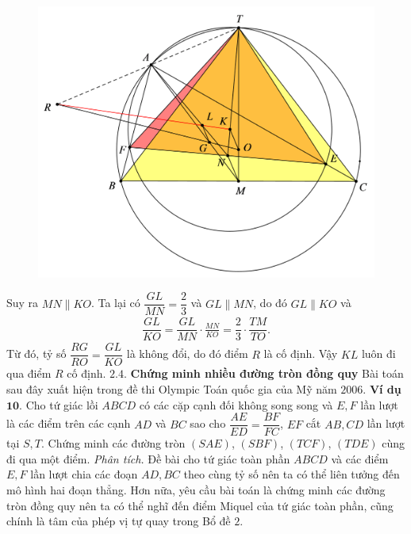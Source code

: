 \begin{multicols}{2}
	\begin{figure}[H]
		\vspace*{-5pt}
		\centering
		\captionsetup{labelformat= empty, justification=centering}
		\includegraphics[width= 1\linewidth]{17}
		\vspace*{-10pt}
	\end{figure}
	Suy ra $MN\parallel KO$. Ta lại có $\dfrac{GL}{MN} = \dfrac{2}{3}$  và $GL\parallel MN$, do đó $GL\parallel KO$ và
	\begin{align*}
		\dfrac{GL}{KO} = \dfrac{GL}{MN}\cdot \frac{MN}{KO} = \dfrac{2}{3} \cdot \dfrac{TM}{TO}.
	\end{align*}
	Từ đó, tỷ số $\dfrac{RG}{RO} = \dfrac{GL}{KO}$ là không đổi, do đó điểm $R$ là cố định. Vậy $KL$ luôn đi qua điểm $R$ cố định.
	\vskip 0.1cm
	$\pmb{2.4.}$ \textbf{\color{hoccungpi}Chứng minh nhiều đường tròn đồng quy}
	\vskip 0.1cm
	Bài toán sau đây xuất hiện trong đề thi Olympic Toán quốc gia của Mỹ năm $2006$.
	\vskip 0.1cm
	\textbf{\color{hoccungpi}Ví dụ $\pmb{10.}$}  Cho tứ giác lồi $ABCD$ có các cặp cạnh đối không song song và $E,F$ lần lượt là các điểm trên các cạnh $AD$ và $BC$ sao cho  $\dfrac{AE}{ED} = \dfrac{BF}{FC}$, $EF$ cắt $AB,CD$ lần lượt tại $S,T$. Chứng minh các đường tròn $(SAE)$, $(SBF)$, $(TCF)$, $(TDE)$ cùng đi qua một điểm.
	\vskip 0.1cm
	\textit{Phân tích.} Đề bài cho tứ giác toàn phần $ABCD$ và các điểm $E,F$ lần lượt chia các đoạn $AD,BC$ theo cùng tỷ số nên ta có thể liên tưởng đến mô hình hai đoạn thẳng. Hơn nữa, yêu cầu bài toán là chứng minh các đường tròn đồng quy nên ta có thể nghĩ đến điểm Miquel của tứ giác toàn phần, cũng chính là tâm của phép vị tự quay trong Bổ đề $2$.

\end{multicols}
